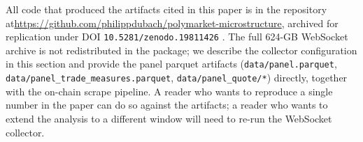 All code that produced the artifacts cited in this paper is in the
repository at\linebreak[1]
\url{https://github.com/philippdubach/polymarket-microstructure},
archived for replication under DOI
\texttt{10.5281/zenodo.19811426}
\citep{dubach-2026-replication}. The full 624-GB WebSocket archive
is not redistributed in the package; we describe the collector
configuration in this section and provide the panel parquet
artifacts
(\texttt{data/\allowbreak panel.parquet},
\texttt{data/\allowbreak panel\_trade\_measures.\allowbreak parquet},
\texttt{data/\allowbreak panel\_quote/*})
directly, together with the on-chain
scrape pipeline. A reader who wants to reproduce a single number in
the paper can do so against the artifacts; a reader who wants to
extend the analysis to a different window will need to re-run the
WebSocket collector.

